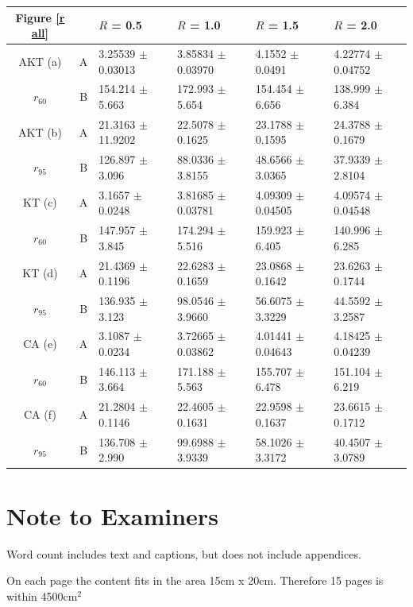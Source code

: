 \documentclass[a4paper,11pt, onecolumn]{article}
\begin{document}
\begin{center}
  \vspace{0.7cm}

  \hspace{-1cm}
  \begin{tabular}{|c|c||l|l|l|l|}
    \hline
    \textbf{Figure \ref{r all}}  & & $R$ = 0.5  & $R$ = 1.0 & $R$ = 1.5  & $R$ = 2.0      \\
    \hline
    AKT (a)  & A & 3.25539 $\pm$ 0.03013 & 3.85834 $\pm$ 0.03970 & 4.1552 $\pm$ 0.0491 & 4.22774 $\pm$ 0.04752 \\
    $r_{60}$ & B & 154.214 $\pm$ 5.663 & 172.993 $\pm$ 5.654 & 154.454 $\pm$ 6.656 & 138.999 $\pm$ 6.384 \\
    \hline
    AKT (b)  & A & 21.3163 $\pm$ 11.9202 & 22.5078 $\pm$ 0.1625 & 23.1788 $\pm$ 0.1595 & 24.3788 $\pm$ 0.1679 \\
    $r_{95}$ & B & 126.897 $\pm$ 3.096 & 88.0336 $\pm$ 3.8155 & 48.6566 $\pm$ 3.0365 & 37.9339 $\pm$ 2.8104 \\
    \hline
    KT (c)   & A & 3.1657 $\pm$ 0.0248 & 3.81685 $\pm$ 0.03781 & 4.09309 $\pm$ 0.04505 & 4.09574 $\pm$ 0.04548 \\
    $r_{60}$ & B & 147.957 $\pm$ 3.845 & 174.294 $\pm$ 5.516 & 159.923 $\pm$ 6.405 & 140.996 $\pm$ 6.285 \\
    \hline
    KT (d)  & A & 21.4369 $\pm$ 0.1196 & 22.6283 $\pm$ 0.1659 & 23.0868 $\pm$ 0.1642 & 23.6263 $\pm$ 0.1744 \\
    $r_{95}$ & B & 136.935 $\pm$ 3.123 & 98.0546 $\pm$ 3.9660 & 56.6075 $\pm$ 3.3229 & 44.5592 $\pm$ 3.2587 \\
    \hline
    CA (e)  & A & 3.1087 $\pm$ 0.0234 & 3.72665 $\pm$ 0.03862 & 4.01441 $\pm$ 0.04643 & 4.18425 $\pm$ 0.04239 \\
    $r_{60}$ & B & 146.113 $\pm$ 3.664 & 171.188 $\pm$ 5.563 & 155.707 $\pm$ 6.478 & 151.104 $\pm$ 6.219 \\
    \hline
    CA (f)  & A & 21.2804 $\pm$ 0.1146 & 22.4605 $\pm$ 0.1631 & 22.9598 $\pm$ 0.1637 & 23.6615 $\pm$ 0.1712 \\
    $r_{95}$ & B & 136.708 $\pm$ 2.990 & 99.6988 $\pm$ 3.9339 & 58.1026 $\pm$ 3.3172 & 40.4507 $\pm$ 3.0789 \\
    \hline
  \end{tabular}

  \end{center}

\newpage
\section*{Note to Examiners}


\noindent Word count includes text and captions, but does not include appendices.


\noindent On each page the content fits in the area 15cm x 20cm. Therefore 15 pages is within 4500$\text{cm}^2$ 


  
   
\end{document}
